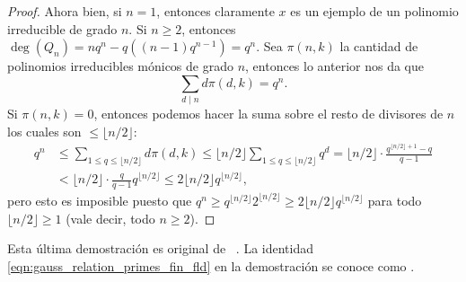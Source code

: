 \documentclass[teoria-numeros.tex]{subfiles}
\begin{document}
\begin{proof}
	Ahora bien, si $n = 1$, entonces claramente $x$ es un ejemplo de un polinomio irreducible de grado $n$.
	Si $n \ge 2$, entonces $\deg(Q_n) = nq^n - q((n-1)q^{n-1}) = q^n$.
	Sea $\pi(n, k)$ la cantidad de polinomios irreducibles mónicos de grado $n$, entonces lo anterior nos da que
	\begin{equation}
		\sum_{d\mid n} d\pi(d, k) = q^n.
		\label{eqn:gauss_relation_primes_fin_fld}
	\end{equation}
	Si $\pi(n, k) = 0$, entonces podemos hacer la suma sobre el resto de divisores de $n$ los cuales son $\le \lfloor n/2 \rfloor$:
	\begin{align*}
		q^n &\le \sum_{1 \le q \le \lfloor n/2 \rfloor} d\pi(d, k) \le \lfloor n/2 \rfloor \sum_{1 \le q \le \lfloor n/2 \rfloor} q^d
		= \lfloor n/2 \rfloor \cdot \frac{q^{\lfloor n/2 \rfloor+1} - q}{q - 1} \\
		    &< \lfloor n/2 \rfloor \cdot \frac{q}{q - 1} q^{\lfloor n/2 \rfloor} \le 2 \lfloor n/2 \rfloor q^{\lfloor n/2 \rfloor},
	\end{align*}
	pero esto es imposible puesto que $q^n \ge q^{\lfloor n/2 \rfloor}2^{\lfloor n/2 \rfloor} \ge 2 \lfloor n/2 \rfloor q^{\lfloor n/2 \rfloor}$
	para todo $\lfloor n/2 \rfloor \ge 1$ (vale decir, todo $n \ge 2$).
\end{proof}

Esta última demostración es original de \citeauthor{soundararajan2020bertrands}~\cite{soundararajan2020bertrands}.
La identidad \eqref{eqn:gauss_relation_primes_fin_fld} en la demostración se conoce como .


\end{document}
